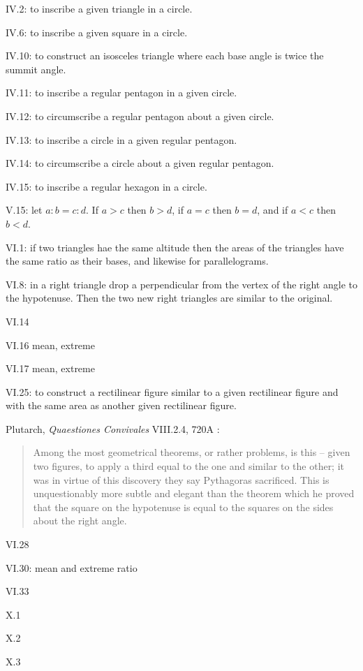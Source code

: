 \documentclass{article}
\theoremstyle{definition}
\begin{document}
IV.2: to inscribe a given triangle in a circle.

IV.6: to inscribe a given square in a circle.

IV.10: to construct an isosceles triangle where each base angle is twice the summit angle.

IV.11: to inscribe a regular pentagon in a given circle.

IV.12: to circumscribe a regular pentagon about a given circle.

IV.13: to inscribe a circle in a given regular pentagon.

IV.14: to circumscribe a circle about a given regular pentagon.

IV.15: to inscribe a regular hexagon in a circle.

V.15: let $a:b=c:d$. If $a>c$ then $b>d$, if $a=c$ then $b=d$, and if $a<c$ then $b<d$. 

VI.1: if two triangles hae the same altitude then the areas of the triangles have the same ratio as their bases, and likewise for parallelograms.

VI.8: in a right triangle drop a perpendicular from the vertex of the right angle to the hypotenuse. Then the two new right triangles are similar
to the original.

VI.14

VI.16 mean, extreme 

VI.17 mean, extreme

VI.25: to construct a rectilinear figure similar to a given rectilinear figure and with the same area as another given rectilinear
figure.

Plutarch, {\em Quaestiones Convivales} VIII.2.4, 720A \cite[p.~177]{thomasI}:

\begin{quote}
Among the most geometrical theorems, or rather
problems, is this -- given two figures, to apply a third
equal to the one and similar to the other; it was
in virtue of this discovery they say Pythagoras
sacrificed. This is unquestionably more subtle and
elegant than the theorem which he proved that the
square on the hypotenuse is equal to the squares on
the sides about the right angle.
\end{quote}

VI.28

VI.30: mean and extreme ratio

VI.33

X.1

X.2

X.3
\end{document}
